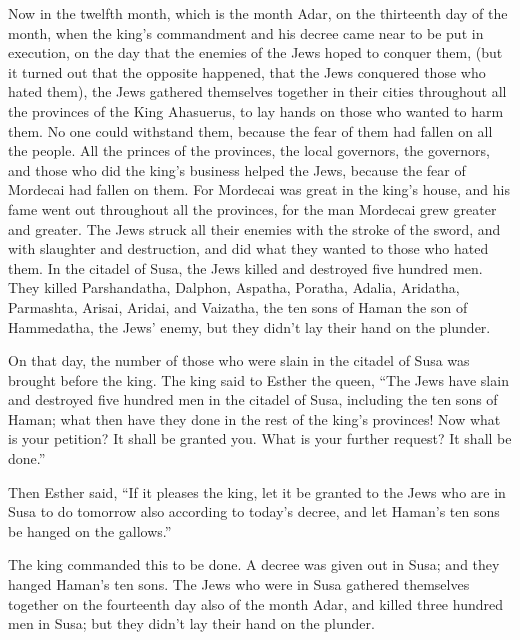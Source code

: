  Now in the twelfth month, which is the month Adar, on the
thirteenth day of the month, when the king's commandment and his decree
came near to be put in execution, on the day that the enemies of the
Jews hoped to conquer them, (but it turned out that the opposite
happened, that the Jews conquered those who hated them), 
the Jews gathered themselves together in their cities throughout all the
provinces of the King Ahasuerus, to lay hands on those who wanted to
harm them. No one could withstand them, because the fear of them had
fallen on all the people.  All the princes of the
provinces, the local governors, the governors, and those who did the
king's business helped the Jews, because the fear of Mordecai had fallen
on them.  For Mordecai was great in the king's house, and
his fame went out throughout all the provinces, for the man Mordecai
grew greater and greater.  The Jews struck all their
enemies with the stroke of the sword, and with slaughter and
destruction, and did what they wanted to those who hated them.
 In the citadel of Susa, the Jews killed and destroyed
five hundred men.  They killed Parshandatha, Dalphon,
Aspatha,  Poratha, Adalia, Aridatha, 
Parmashta, Arisai, Aridai, and Vaizatha,  the ten sons of
Haman the son of Hammedatha, the Jews' enemy, but they didn't lay their
hand on the plunder.

 On that day, the number of those who were slain in the
citadel of Susa was brought before the king.  The king
said to Esther the queen, ``The Jews have slain and destroyed five
hundred men in the citadel of Susa, including the ten sons of Haman;
what then have they done in the rest of the king's provinces! Now what
is your petition? It shall be granted you. What is your further request?
It shall be done.''

 Then Esther said, ``If it pleases the king, let it be
granted to the Jews who are in Susa to do tomorrow also according to
today's decree, and let Haman's ten sons be hanged on the gallows.''

 The king commanded this to be done. A decree was given
out in Susa; and they hanged Haman's ten sons.  The Jews
who were in Susa gathered themselves together on the fourteenth day also
of the month Adar, and killed three hundred men in Susa; but they didn't
lay their hand on the plunder.

